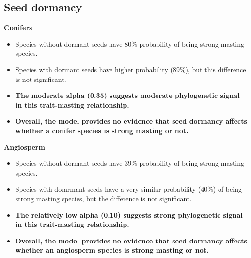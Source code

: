 \documentclass{article}
\begin{document}
\subsection{Seed dormancy}
\textbf{Conifers}\\
\begin{itemize}
\item Species without dormant seeds have 80\% probability of being strong masting species.
\item Species with dormant seeds have higher probability (89\%), but this difference is not significant.
\item \textbf{The moderate alpha (0.35) suggests moderate phylogenetic signal in this trait-masting relationship.}
\item \textbf{Overall, the model provides no evidence that seed dormancy affects whether a conifer species is strong masting or not.}
\end{itemize}
\textbf{Angiosperm}\\
\begin{itemize}
\item Species without dormant seeds have 39\% probability of being strong masting species.
\item Species with domrmant seeds have a very similar probability (40\%) of being strong masting species, but the difference is not significant.
\item \textbf{The relatively low alpha (0.10) suggests strong phylogenetic signal in this trait-masting relationship.}
\item \textbf{Overall, the model provides no evidence that seed dormancy affects whether an angiosperm species is strong masting or not.}
\end{itemize}
\end{document}
